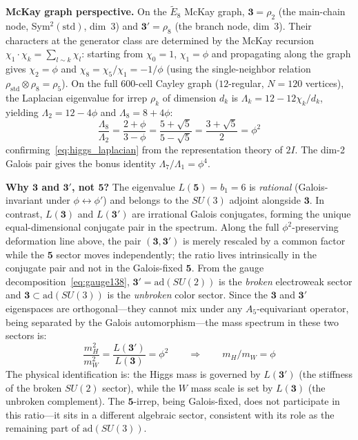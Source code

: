 \documentclass[12pt,a4paper]{article}
\theoremstyle{definition}
\begin{document}
\textbf{McKay graph perspective.}  On the $\widetilde{E}_8$ McKay graph, $\mathbf{3} = \rho_2$ (the main-chain node, Sym$^2(\text{std})$, dim~3) and $\mathbf{3'} = \rho_8$ (the branch node, dim~3).  Their characters at the generator class are determined by the McKay recursion $\chi_1 \cdot \chi_k = \sum_{l \sim k} \chi_l$: starting from $\chi_0 = 1$, $\chi_1 = \phi$ and propagating along the graph gives $\chi_2 = \phi$ and $\chi_8 = \chi_5/\chi_1 = -1/\phi$ (using the single-neighbor relation $\rho_{\mathrm{std}} \otimes \rho_8 = \rho_5$).  On the full 600-cell Cayley graph ($12$-regular, $N=120$ vertices), the Laplacian eigenvalue for irrep $\rho_k$ of dimension $d_k$ is $\Lambda_k = 12 - 12\chi_k/d_k$, yielding $\Lambda_2 = 12 - 4\phi$ and $\Lambda_8 = 8 + 4\phi$:
\begin{equation}
\frac{\Lambda_8}{\Lambda_2} = \frac{2+\phi}{3-\phi} = \frac{5+\sqrt{5}}{5-\sqrt{5}} = \frac{3+\sqrt{5}}{2} = \phi^2
\label{eq:higgs_mckay}
\end{equation}
confirming~\eqref{eq:higgs_laplacian} from the representation theory of $2I$.  The dim-2 Galois pair gives the bonus identity $\Lambda_7/\Lambda_1 = \phi^4$.

\textbf{Why $\mathbf{3}$ and $\mathbf{3'}$, not $\mathbf{5}$?}  The eigenvalue $L(\mathbf{5}) = b_1 = 6$ is \emph{rational} (Galois-invariant under $\phi \leftrightarrow \phi'$) and belongs to the $SU(3)$ adjoint alongside $\mathbf{3}$.  In contrast, $L(\mathbf{3})$ and $L(\mathbf{3'})$ are irrational Galois conjugates, forming the unique equal-dimensional conjugate pair in the spectrum.  Along the full $\phi^2$-preserving deformation line above, the pair $(\mathbf{3},\mathbf{3'})$ is merely rescaled by a common factor while the $\mathbf{5}$ sector moves independently; the ratio lives intrinsically in the conjugate pair and not in the Galois-fixed $\mathbf{5}$.  From the gauge decomposition~\eqref{eq:gauge138}, $\mathbf{3'} = \mathrm{ad}(SU(2))$ is the \emph{broken} electroweak sector and $\mathbf{3} \subset \mathrm{ad}(SU(3))$ is the \emph{unbroken} color sector.  Since the $\mathbf{3}$ and $\mathbf{3'}$ eigenspaces are orthogonal---they cannot mix under any $A_5$-equivariant operator, being separated by the Galois automorphism---the mass spectrum in these two sectors is:
\begin{equation}
\frac{m_H^2}{m_W^2} = \frac{L(\mathbf{3'})}{L(\mathbf{3})} = \phi^2 \qquad \Longrightarrow \qquad m_H/m_W = \phi
\end{equation}
The physical identification is: the Higgs mass is governed by $L(\mathbf{3'})$ (the stiffness of the broken $SU(2)$ sector), while the $W$ mass scale is set by $L(\mathbf{3})$ (the unbroken complement).  The $\mathbf{5}$-irrep, being Galois-fixed, does not participate in this ratio---it sits in a different algebraic sector, consistent with its role as the remaining part of $\mathrm{ad}(SU(3))$.
\end{document}
